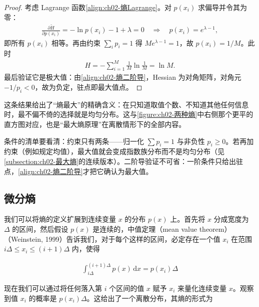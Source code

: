 \documentclass[../../main.tex]{subfiles}
\begin{document}
\begin{proof}
考虑 Lagrange 函数\eqref{align:ch02-熵Lagrange}。对 $p(x_i)$ 求偏导并令其为零：
\begin{align*}
  \frac{\partial\tilde{H}}{\partial p(x_i)} = -\ln p(x_i) - 1 + \lambda = 0
  \quad\Longrightarrow\quad
  p(x_i) = e^{\lambda-1} ,
\end{align*}
即所有 $p(x_i)$ 相等。再由约束 $\sum_ip_i=1$ 得 $Me^{\lambda-1}=1$，故 $p(x_i)=1/M$。此时
\begin{align*}
  H = -\sum_{i=1}^{M}\frac{1}{M}\ln\frac{1}{M} = \ln M .
\end{align*}
最后验证它是极大值：由\eqref{align:ch02-熵二阶导}，Hessian 为对角矩阵，对角元 $-1/p_i<0$，故为负定，驻点即最大值点。
\end{proof}

\begin{remark}
这条结果给出了“熵最大”的精确含义：在只知道取值个数、不知道其他任何信息时，最不偏不倚的选择就是均匀分布。这与\cref{figure:ch02-两种熵}中右侧那个更平的直方图对应，也是“最大熵原理”在离散情形下的全部内容。

条件的清单要看清：约束只有两条——归一化 $\sum p_i=1$ 与非负性 $p_i\geqslant0$。若再加约束（例如规定均值），最大值就会变成指数族分布而不是均匀分布（见\cref{subsection:ch02-最大熵}的连续版本）。二阶导验证不可省：一阶条件只给出驻点，\eqref{align:ch02-熵二阶导}才把它确认为最大值。
\end{remark}

\subsection{微分熵}\label{subsection:ch02-微分熵}

我们可以将熵的定义扩展到连续变量 $x$ 的分布 $p(x)$ 上。首先将 $x$ 分成宽度为 $\Delta$ 的区间，然后假设 $p(x)$ 是连续的，中值定理（mean value theorem）（Weinstein, 1999）告诉我们，对于每个这样的区间，必定存在一个值 $x_i$ 在范围 $i\Delta\leqslant x_i\leqslant(i+1)\Delta$ 内，使得

\begin{align}
  \int_{i\Delta}^{(i+1)\Delta} p(x)\,\mathrm{d}x = p(x_i)\Delta
  \label{align:ch02-中值定理}
\end{align}

现在我们可以通过将任何落入第 $i$ 个区间的值 $x$ 赋予 $x_i$ 来量化连续变量 $x$。观察到值 $x_i$ 的概率是 $p(x_i)\Delta$。这给出了一个离散分布，其熵的形式为
\end{document}
